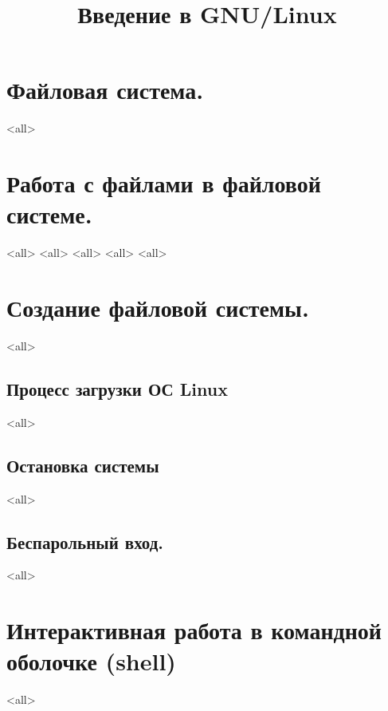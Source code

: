 

\title{Введение в GNU/Linux}




\begin{frame}
	\frametitle{}
	\titlepage
	\vspace{-0.5cm}
	\begin{center}
	\end{center}
\end{frame}


\begin{frame}
	\tableofcontents
	[hideallsubsections]
\end{frame}


\section{Файловая система.}
\mode<all>{}
\section{Работа с файлами в файловой системе.}
\mode<all>{}
\mode<all>{}
\mode<all>{}
\mode<all>{}
\mode<all>{}
\section{Создание файловой системы.}
\mode<all>{}
\subsection{Процесс загрузки ОС Linux}
\mode<all>{}
\subsection{Остановка системы}
\mode<all>{}

\subsection{Беспарольный вход.}
\mode<all>{}
\section{Интерактивная работа в командной оболочке (shell)}
\mode<all>{}

\bye
